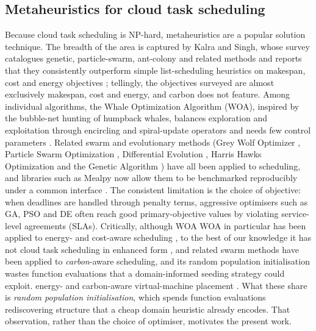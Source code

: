 \documentclass[12pt,a4paper]{article}
\providecommand{\DIFaddtex}[1]{{\protect\color{blue} \sf #1}} %
\providecommand{\DIFdeltex}[1]{{\protect\color{red} \scriptsize #1}} %
\providecommand{\DIFaddbegin}{} %
\providecommand{\DIFaddend}{} %
\providecommand{\DIFdelbegin}{} %
\providecommand{\DIFdelend}{} %
\providecommand{\DIFadd}[1]{\texorpdfstring{\DIFaddtex{#1}}{#1}} %
\providecommand{\DIFdel}[1]{\texorpdfstring{\DIFdeltex{#1}}{}} %
\providecommand{\DIFscaledelfig}{0.5}
\newlength{\DIFdelgraphicswidth} %
\newlength{\DIFdelgraphicsheight} %
\providecommand{\DIFaddincludegraphics}[2][]{{\color{blue}\fbox{\DIFOincludegraphics[#1]{#2}}}} %
\providecommand{\DIFdelincludegraphics}[2][]{%
\sbox{\DIFdelgraphicsbox}{\DIFOincludegraphics[#1]{#2}}%
\settoboxwidth{\DIFdelgraphicswidth}{\DIFdelgraphicsbox} %
\settoboxtotalheight{\DIFdelgraphicsheight}{\DIFdelgraphicsbox} %
\scalebox{\DIFscaledelfig}{%
\parbox[b]{\DIFdelgraphicswidth}{\usebox{\DIFdelgraphicsbox}\\[-\baselineskip] \rule{\DIFdelgraphicswidth}{0em}}\llap{\resizebox{\DIFdelgraphicswidth}{\DIFdelgraphicsheight}{%
\setlength{\unitlength}{\DIFdelgraphicswidth}%
\begin{picture}(1,1)%
\thicklines\linethickness{2pt} %
{\color[rgb]{1,0,0}\put(0,0){\framebox(1,1){}}}%
{\color[rgb]{1,0,0}\put(0,0){\line( 1,1){1}}}%
{\color[rgb]{1,0,0}\put(0,1){\line(1,-1){1}}}%
\end{picture}%
}\hspace*{3pt}}} %
} %
\DeclareRobustCommand{\DIFaddbegin}{\DIFOaddbegin \let\includegraphics\DIFaddincludegraphics} %
\DeclareRobustCommand{\DIFaddend}{\DIFOaddend \let\includegraphics\DIFOincludegraphics} %
\DeclareRobustCommand{\DIFdelbegin}{\DIFOdelbegin \let\includegraphics\DIFdelincludegraphics} %
\DeclareRobustCommand{\DIFdelend}{\DIFOaddend \let\includegraphics\DIFOincludegraphics} %
\begin{document}
\subsection{Metaheuristics for cloud task scheduling}
Because cloud task scheduling is NP-hard, metaheuristics are a popular solution technique. The breadth of the
area is captured by Kalra and Singh, whose survey catalogues genetic, particle-swarm, ant-colony and related
methods and reports that they consistently outperform simple list-scheduling heuristics on makespan, cost and
energy objectives \cite{kalra2015review}; tellingly, the objectives surveyed are almost exclusively makespan,
cost and energy, and carbon does not feature. Among individual algorithms, the Whale Optimization Algorithm
(WOA), inspired by the bubble-net hunting of humpback whales, balances exploration and exploitation through
encircling and spiral-update operators and needs few control parameters \cite{mirjalili2016whale}. Related
swarm and evolutionary methods (Grey Wolf Optimizer \cite{mirjalili2014grey}, Particle Swarm Optimization
\cite{kennedy1995particle}, Differential Evolution \cite{storn1997differential}, Harris Hawks Optimization
\cite{heidari2019harris} and the Genetic Algorithm \cite{holland1992adaptation}) have all been applied to
scheduling, and libraries such as Mealpy now allow them to be benchmarked reproducibly under a common
interface \cite{vanthieu2023mealpy}. The consistent limitation is the choice of objective: when deadlines are
handled through penalty terms, aggressive optimisers such as GA, PSO and DE often reach good primary-objective
values by violating service-level agreements (SLAs). \DIFdelbegin \DIFdel{Critically, although WOA }\DIFdelend \DIFaddbegin \DIFadd{WOA in particular }\DIFaddend has been applied to \DIFdelbegin \DIFdel{energy- and
cost-aware scheduling , to the best of our knowledge it has not }\DIFdelend \DIFaddbegin \DIFadd{cloud task scheduling in enhanced form
\cite{zhang2024ewoa}, and related swarm methods have }\DIFaddend been applied to \DIFdelbegin \DIFdel{\emph{carbon}-aware scheduling,
and its random population initialisation wastes function evaluations that a domain-informed seeding strategy
could exploit. }\DIFdelend \DIFaddbegin \DIFadd{energy- and carbon-aware virtual-machine
placement \cite{feng2025gwo, madhusudhan2023hho, kumar2023eeoa, abbasikhazaei2022energy}. What these share is
\emph{random population initialisation}, which spends function evaluations rediscovering structure that a
cheap domain heuristic already encodes. That observation, rather than the choice of optimiser, motivates the
present work.
}\DIFaddend 
\end{document}

